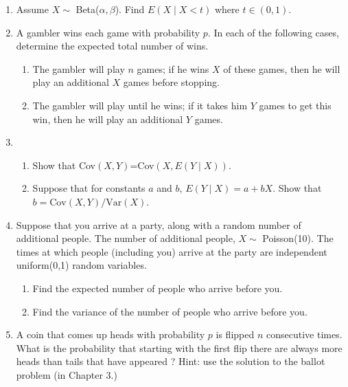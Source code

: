 \documentclass{article}
\begin{document}
\begin{enumerate}
\item Assume $X\sim$ Beta($\alpha,\beta$).  Find $E(X\mid X < t)$ where $t\in (0,1)$.

\item A gambler wins each game with probability $p$. In each of the following cases, determine the expected total number of wins.
\begin{enumerate}
\item The gambler will play $n$ games; if he wins $X$ of these games, then he will play an additional $X$ games before stopping. 
\item The gambler will play until he wins; if it takes him $Y$ games to get this win, then he will play an additional $Y$ games.
\end{enumerate}

\item 
\begin{enumerate}
\item Show that Cov$(X,Y)$=Cov$(X, E(Y\mid X))$.
\item Suppose that for constants $a$ and $b$, $E(Y\mid X) = a + bX$. Show that $b = \mbox{Cov}(X,Y)/\mbox{Var}(X)$.
\end{enumerate}

\item Suppose that you arrive at a party, along with a random number
  of additional people. The number of additional people, $X\sim$
  Poisson(10). The times at which people (including you) arrive at the
  party are independent uniform(0,1) random variables.
\begin{enumerate}
\item Find the expected number of people who arrive before you.
\item Find the variance of the number of people who arrive before you.
\end{enumerate}

\item A coin that comes up heads with probability $p$ is flipped $n$
  consecutive times. What is the probability that starting with the
  first flip there are always more heads than tails that have appeared
  ? Hint: use the solution to the ballot problem (in Chapter 3.)


\end{enumerate}
\end{document}
